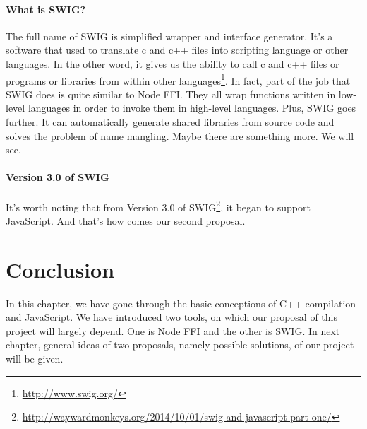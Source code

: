             \paragraph{What is SWIG?} The full name of SWIG is simplified wrapper and interface generator. It's a software that used to translate c and c++ files into scripting language or other languages. In the other word, it gives us the ability to call c and c++ files or programs or libraries from within other languages\footnote{\url{http://www.swig.org/}}.
            In fact, part of the job that SWIG does is quite similar to Node FFI. They all wrap functions written in low-level languages in order to invoke them in high-level languages. Plus, SWIG goes further. It can automatically generate shared libraries from source code and solves the problem of name mangling. Maybe there are something more. We will see. 
            
            \paragraph{Version 3.0 of SWIG}
            It's worth noting that from Version 3.0 of SWIG\footnote{\url{http://waywardmonkeys.org/2014/10/01/swig-and-javascript-part-one/}}, it began to support JavaScript. And that's how comes our second proposal. 

  

\section{Conclusion}
In this chapter, we have gone through the basic conceptions of C++ compilation and JavaScript. We have introduced two tools, on which our proposal of this project will largely depend. One is Node FFI and the other is SWIG. In next chapter, general ideas of two proposals, namely possible solutions, of our project will be given.  
  

